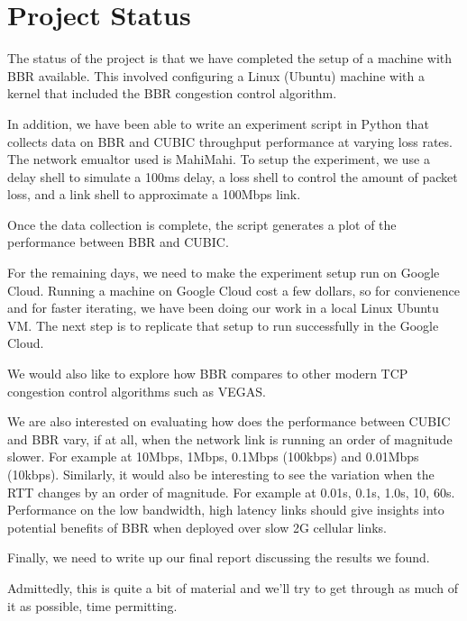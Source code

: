 
\section{Project Status}

The status of the project is that we have completed the setup of a machine with BBR available. This involved
configuring a Linux (Ubuntu) machine with a kernel that included the BBR congestion control algorithm.

In addition, we have been able to write an experiment script in Python that collects data on BBR and CUBIC
throughput performance at varying loss rates. The network emualtor used is MahiMahi. To setup the experiment,
we use a delay shell to simulate a 100ms delay, a loss shell to control the amount of packet loss, and a link
shell to approximate a 100Mbps link.

Once the data collection is complete, the script generates a plot of the performance between BBR and CUBIC.


For the remaining days, we need to make the experiment setup run on Google Cloud. Running a machine on Google Cloud
cost a few dollars, so for convienence and for faster iterating, we have been doing our work in a local Linux Ubuntu
VM. The next step is to replicate that setup to run successfully in the Google Cloud.

We would also like to explore how BBR compares to other modern TCP congestion control algorithms
such as VEGAS.

We are also interested on evaluating how does the performance between CUBIC and BBR vary, if at all, when the network
link is running an order of magnitude slower. For example at 10Mbps, 1Mbps, 0.1Mbps (100kbps) and 0.01Mbps (10kbps).
Similarly, it would also be interesting to see the variation when the RTT changes by an order of magnitude. For example
at 0.01s, 0.1s, 1.0s, 10, 60s. Performance on the low bandwidth, high latency links should give insights into
potential benefits of BBR when deployed over slow 2G cellular links.

Finally, we need to write up our final report discussing the results we found.

Admittedly, this is  quite a bit of material and we'll try to get through as much of it as possible, time permitting.

